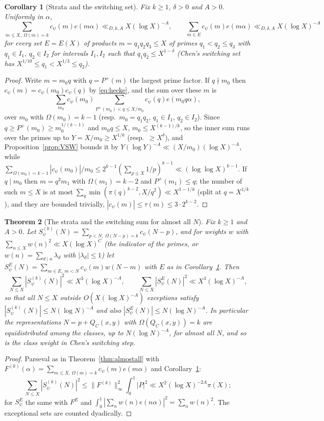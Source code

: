 ﻿\documentclass[11pt]{amsart}
\newtheorem{theorem}{Theorem}[section]
\newtheorem{corollary}[theorem]{Corollary}
\theoremstyle{remark}
\begin{document}
\begin{corollary}[Strata and the switching set]\label{cor:strata}
Fix $k\ge1$, $\delta>0$ and $A>0$. Uniformly in $\alpha$,
\[
\sum_{m\le X,\ \Omega(m)=k}c_\psi(m)e(m\alpha)\ll_{D,k,A}X(\log X)^{-A},\qquad\sum_{m\in E}c_\psi(m)e(m\alpha)\ll_{D,\delta,A}X(\log X)^{-A}
\]
for every set $E=E(X)$ of products $m=q_1q_2q_3\le X$ of primes $q_1<q_2\le q_3$ with $q_1\in I_1$, $q_2\in I_2$ for intervals $I_1,I_2$ such that $q_1q_2\le X^{1-\delta}$ (Chen's switching set has $X^{1/10}\le q_1<X^{1/3}\le q_2$).
\end{corollary}
\begin{proof}
Write $m=m_0q$ with $q=P^+(m)$ the largest prime factor. If $q\nmid m_0$ then $c_\psi(m)=c_\psi(m_0)c_\psi(q)$ by \eqref{eq:hecke}, and the sum over these $m$ is
\[
\sum_{m_0}c_\psi(m_0)\sum_{P^+(m_0)<q\le X/m_0}c_\psi(q)e(m_0q\alpha),
\]
over $m_0$ with $\Omega(m_0)=k-1$ (resp.\ $m_0=q_1q_2$, $q_1\in I_1$, $q_2\in I_2$). Since $q\ge P^+(m_0)\ge m_0^{1/(k-1)}$ and $m_0q\le X$, $m_0\le X^{(k-1)/k}$, so the inner sum runs over the primes up to $Y=X/m_0\ge X^{1/k}$ (resp.\ $\ge X^\delta$), and Proposition~\ref{prop:VSW} bounds it by $Y(\log Y)^{-A}\ll(X/m_0)(\log X)^{-A}$, while $\sum_{\Omega(m_0)=k-1}|c_\psi(m_0)|/m_0\le2^{k-1}(\sum_{p\le X}1/p)^{k-1}\ll(\log\log X)^{k-1}$. If $q\mid m_0$ then $m=q^2m_1$ with $\Omega(m_1)=k-2$ and $P^+(m_1)\le q$; the number of such $m\le X$ is at most $\sum_q\min(\pi(q)^{k-2},X/q^2)\ll X^{1-1/k}$ (split at $q=X^{1/k}$), and they are bounded trivially, $|c_\psi(m)|\le\tau(m)\le3\cdot2^{k-2}$.
\end{proof}

\begin{theorem}[The strata and the switching sum for almost all $N$]\label{thm:strata}
Fix $k\ge1$ and $A>0$. Let $S^{(k)}_\psi(N)=\sum_{p<N,\ \Omega(N-p)=k}c_\psi(N-p)$, and for weights $w$ with $\sum_{n\le X}w(n)^2\ll X(\log X)^C$ (the indicator of the primes, or $w(n)=\sum_{d\mid n}\lambda_d$ with $|\lambda_d|\le1$) let $S^E_\psi(N)=\sum_{m\in E,\ m<N}c_\psi(m)w(N-m)$ with $E$ as in Corollary~\ref{cor:strata}. Then
\[
\sum_{N\le X}|S^{(k)}_\psi(N)|^2\ll X^3(\log X)^{-A},\qquad\sum_{N\le X}|S^E_\psi(N)|^2\ll X^3(\log X)^{-A},
\]
so that all $N\le X$ outside $O(X(\log X)^{-A})$ exceptions satisfy $|S^{(k)}_\psi(N)|\le N(\log N)^{-A}$ and also $|S^E_\psi(N)|\le N(\log N)^{-A}$. In particular the representations $N=p+Q_C(x,y)$ with $\Omega(Q_C(x,y))=k$ are equidistributed among the classes, up to $N(\log N)^{-A}$, for almost all $N$, and so is the class weight in Chen's switching step.
\end{theorem}
\begin{proof}
Parseval as in Theorem~\ref{thm:almostall} with $F^{(k)}(\alpha)=\sum_{m\le X,\,\Omega(m)=k}c_\psi(m)e(m\alpha)$ and Corollary~\ref{cor:strata}:
\[
\sum_{N\le X}|S^{(k)}_\psi(N)|^2\le\|F^{(k)}\|_\infty^2\int_0^1|P|^2\ll X^2(\log X)^{-2A}\pi(X);
\]
for $S^E_\psi$ the same with $F^E$ and $\int_0^1|\sum_nw(n)e(n\alpha)|^2=\sum_nw(n)^2$. The exceptional sets are counted dyadically.
\end{proof}
\end{document}
